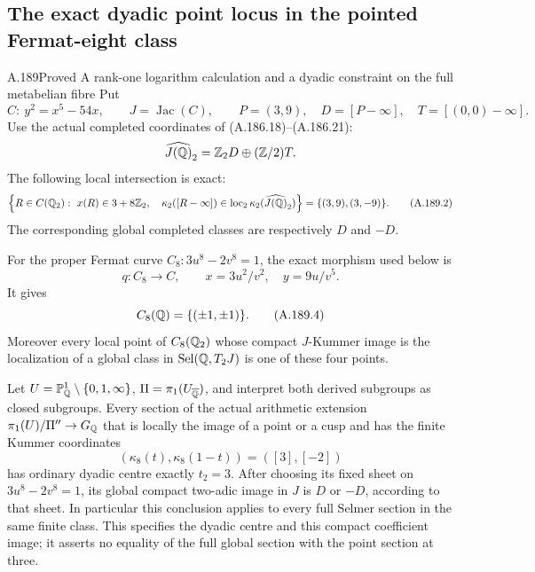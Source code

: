 \subsection{The exact dyadic point locus in the pointed Fermat-eight class}

\begin{statement}{A.189}{Proved}
{A rank-one logarithm calculation and a dyadic constraint on the full metabelian fibre}
Put
\[
 C:\ y^2=x^5-54x,\qquad J=\operatorname{Jac}(C),\qquad
 P=(3,9),\quad D=[P-\infty],\quad T=[(0,0)-\infty].
\tag{A.189.1}
\]
Use the actual completed coordinates of
(A.186.18)--(A.186.21):
\[
          \widehat{J(\mathbb Q)}_2=\mathbb Z_2D\oplus(\mathbb Z/2)T.
\]
The following local intersection
is exact:
\[
\left\{R\in C(\mathbb Q_2):\ x(R)\in3+8\mathbb Z_2,\quad
 \kappa_2([R-\infty])\in
 \operatorname{loc}_2\kappa_2(\widehat{J(\mathbb Q)}_2)\right\}
                   =\{(3,9),(3,-9)\}.
\tag{A.189.2}
\]
The corresponding global completed classes are respectively
\(D\) and \(-D\).

For the proper Fermat curve \(C_8:3u^8-2v^8=1\),
the exact morphism used below is
\[
 q:C_8\longrightarrow C,\qquad
       x=3u^2/v^2,\quad y=9u/v^5.
\tag{A.189.3}
\]
It gives
\[
                         C_8(\mathbb Q)=\{(\pm1,\pm1)\}.
\tag{A.189.4}
\]
Moreover every local point of \(C_8(\mathbb Q_2)\) whose
compact \(J\)-Kummer image is the localization of a
global class in \(\operatorname{Sel}(\mathbb Q,T_2J)\)
is one of these four points.

Let \(U=\mathbb P^1_\mathbb Q\setminus\{0,1,\infty\}\),
\(\Pi=\pi_1(U_{\overline{\mathbb Q}})\), and interpret both
derived subgroups as closed subgroups.  Every section
of the actual arithmetic extension
\(\pi_1(U)/\Pi''\to G_\mathbb Q\) that is locally
the image of a point or a cusp and has the finite
Kummer coordinates
\[
             (\kappa_8(t),\kappa_8(1-t))=([3],[-2])
\tag{A.189.5}
\]
has ordinary dyadic centre exactly \(t_2=3\).
After choosing its fixed sheet on
\(3u^8-2v^8=1\), its global compact two-adic image
in \(J\) is \(D\) or \(-D\), according to that
sheet.  In particular this conclusion applies to
every full Selmer section in the same finite class.
This specifies the dyadic centre and this compact
coefficient image; it asserts no equality of the full
global section with the point section at three.
\end{statement}


